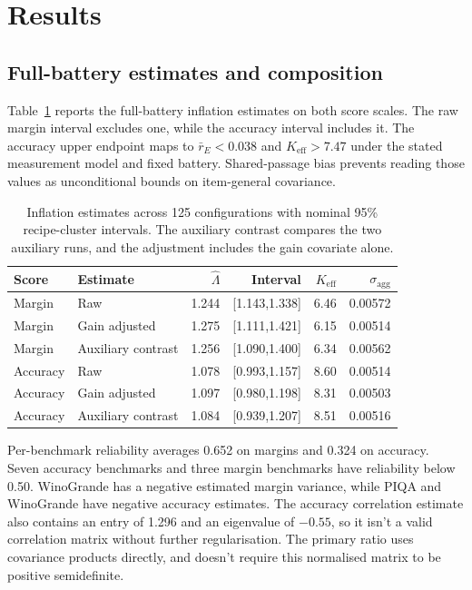 \documentclass{article}
\newcommand{\Lam}{\Lambda}
\begin{document}
\section{Results}
\subsection{Full-battery estimates and composition}
Table~\ref{tab:primary} reports the full-battery inflation estimates on both score scales. The raw margin interval excludes one, while the accuracy interval includes it. The accuracy upper endpoint maps to $\bar r_E<0.038$ and $K_{\mathrm{eff}}>7.47$ under the stated measurement model and fixed battery. Shared-passage bias prevents reading those values as unconditional bounds on item-general covariance.

\begin{table}[t]
\centering
\caption{Inflation estimates across 125 configurations with nominal 95\% recipe-cluster intervals. The auxiliary contrast compares the two auxiliary runs, and the adjustment includes the gain covariate alone.}
\label{tab:primary}
\begin{tabular}{llrrrr}
\toprule
Score & Estimate & $\widehat\Lam$ & Interval & $K_{\mathrm{eff}}$ & $\sigma_{\mathrm{agg}}$\\
\midrule
Margin & Raw & 1.244 & [1.143,1.338] & 6.46 & 0.00572\\
Margin & Gain adjusted & 1.275 & [1.111,1.421] & 6.15 & 0.00514\\
Margin & Auxiliary contrast & 1.256 & [1.090,1.400] & 6.34 & 0.00562\\
Accuracy & Raw & 1.078 & [0.993,1.157] & 8.60 & 0.00514\\
Accuracy & Gain adjusted & 1.097 & [0.980,1.198] & 8.31 & 0.00503\\
Accuracy & Auxiliary contrast & 1.084 & [0.939,1.207] & 8.51 & 0.00516\\
\bottomrule
\end{tabular}
\end{table}

Per-benchmark reliability averages 0.652 on margins and 0.324 on accuracy. Seven accuracy benchmarks and three margin benchmarks have reliability below 0.50. WinoGrande has a negative estimated margin variance, while PIQA and WinoGrande have negative accuracy estimates. The accuracy correlation estimate also contains an entry of 1.296 and an eigenvalue of $-0.55$, so it isn't a valid correlation matrix without further regularisation. The primary ratio uses covariance products directly, and doesn't require this normalised matrix to be positive semidefinite.
\end{document}
